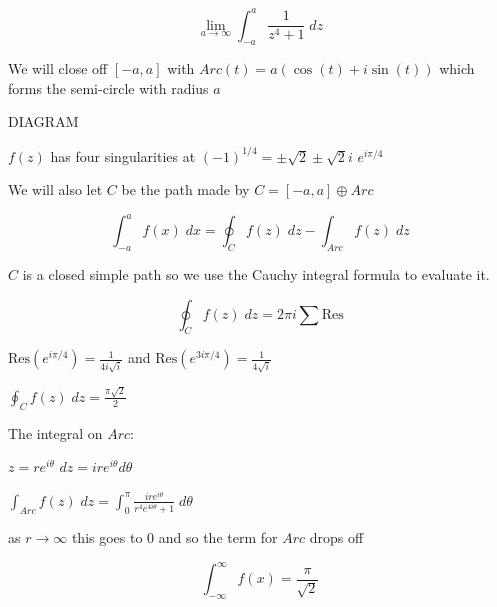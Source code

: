 \begin{equation}
	\lim_{a\to \infty} \int_{-a}^a \frac{1}{z^4+1} \; dz
\end{equation}

We will close off $[-a, a]$ with $Arc(t) = a ( \cos(t) + i \sin(t))$ which forms the semi-circle with radius $a$

DIAGRAM

$f(z)$ has four singularities at $(-1)^{1/4} =  \pm \sqrt{2} \pm \sqrt{2}i$
$e^{i \pi/4} $


We will also let $C$ be the path made by $C= [-a, a] \oplus Arc$ 

\begin{equation}
	\int_{-a}^a f(x)\;dx = \oint_{C} f(z)\;dz - \int_{Arc} f(z) \; dz
\end{equation}

$C$ is a closed simple path so we use the Cauchy integral formula to evaluate it.

\begin{equation}
	\oint_C f(z) \;dz = 2 \pi i \sum \text{Res}
\end{equation}

$\text{Res}(e^{i\pi/4}) = \frac{1}{4 i \sqrt{i}}$ and $\text{Res}(e^{3i\pi/4}) = \frac{1}{4 \sqrt{i}}$ 

$\oint_C f(z) \;dz = \frac{\pi \sqrt{2}}{2}$

The integral on $Arc$:

$z = re^{i \theta}$ $dz=ire^{i\theta} d\theta$

$\int_{Arc} f(z) \;dz = \int_0^\pi \frac{ire^{i\theta}}{r^4 e^{4i\theta} +1} \; d\theta$

as $r \to \infty$ this goes to 0  and so the term for $Arc$ drops off

\begin{equation}
	\int_{-\infty}^\infty f(x) = \frac{\pi }{\sqrt{2}}
\end{equation}

